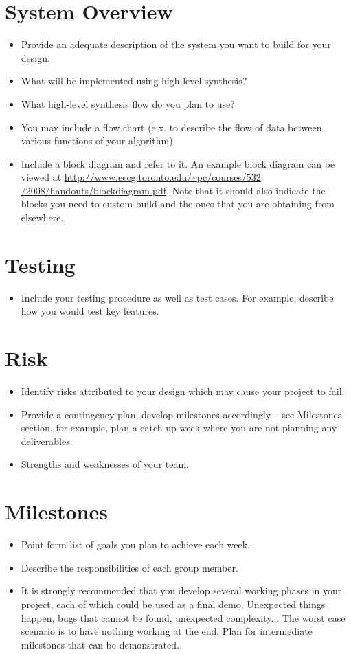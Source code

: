 \documentclass[conference,compsoc]{IEEEtran/IEEEtran}
\begin{document}
\section{System Overview}
\begin{itemize}
\item Provide an adequate description of the system you want to build for your design.
\item What will be implemented using high-level synthesis?
\item What high-level synthesis flow do you plan to use?
\item You may include a flow chart (e.x. to describe the flow of data between various functions of your algorithm)
\item Include a block diagram and refer to it.
An example block diagram can be viewed at \href{http://www.eecg.toronto.edu/~pc/courses/532/2008/handouts/blockdiagram.pdf}{http://www.eecg.toronto.edu/\~{}pc/courses/532 /2008/handouts/blockdiagram.pdf}.
Note that it should also indicate the blocks you need to custom-build and the ones that you are obtaining from elsewhere.
\end{itemize}


\section{Testing}
\begin{itemize}
\item 
Include your testing procedure as well as test cases.
For example, describe how you would test key features.
\end{itemize}


\section{Risk}
\begin{itemize}
\item Identify risks attributed to your design which may cause your project to fail.
\item Provide a contingency plan, develop milestones accordingly -- see Milestones section, for example, plan a catch up week where you are not planning any deliverables.
\item Strengths and weaknesses of your team.
\end{itemize}

 
\section{Milestones}
\begin{itemize}
\item Point form list of goals you plan to achieve each week.
\item Describe the responsibilities of each group member.
\item It is strongly recommended that you develop several working phases in your project, each of which could be used as a final demo.  Unexpected things happen, bugs that cannot be found, unexpected complexity... The worst case scenario is to have nothing working at the end.  Plan for intermediate milestones that can be demonstrated.
\end{itemize}

  
\end{document}

